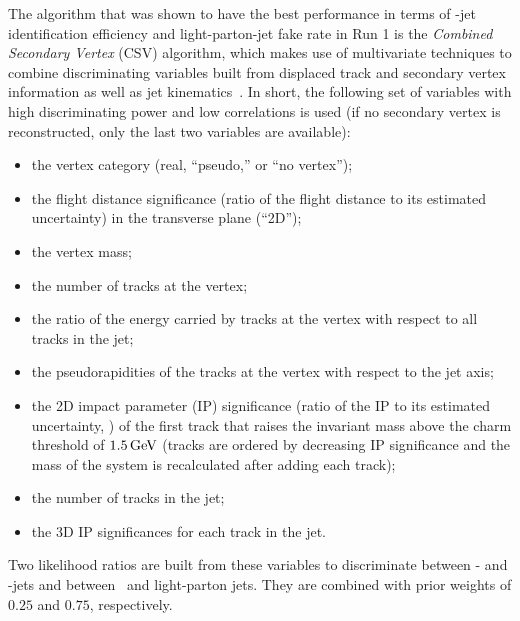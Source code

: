 The algorithm that was shown to have the best performance
in terms of \cPqb-jet identification efficiency and light-parton-jet fake rate
in Run 1 is the \emph{Combined Secondary Vertex} (CSV)
algorithm, which makes use of multivariate techniques to combine
discriminating variables built from displaced track and secondary
vertex information as well as jet
kinematics~\cite{btag7TeV,btag8TeV}. In short, the following set of
variables with high discriminating power and low correlations is used
(if no secondary vertex is reconstructed, only the last two variables are available): 
\begin{itemize}
\item the vertex category (real, ``pseudo,'' or ``no vertex'');
\item the flight distance significance (ratio of the flight
  distance to its estimated uncertainty) in the transverse plane (``2D'');
\item the vertex mass;
\item the number of tracks at the vertex;
\item the ratio of the energy carried by tracks at the vertex with respect to all tracks in the jet;
\item the pseudorapidities of the tracks at the vertex with respect to the jet axis;
\item the 2D impact parameter (IP) significance (ratio of the IP to its estimated uncertainty, ) of the first track that raises the invariant mass above the charm threshold of $1.5 \,\text{Ge\hspace{-.08em}V}$ (tracks are ordered by decreasing IP significance and the mass of the system is recalculated after adding each track);
\item the number of tracks in the jet;
\item the 3D IP significances for each track in the jet.
\end{itemize}
Two likelihood ratios are built from these variables to
discriminate between \cPqb-  and \cPqc-jets and between \cPqb\ and
light-parton jets. They are combined with prior weights of $0.25$ and $0.75$, respectively.

